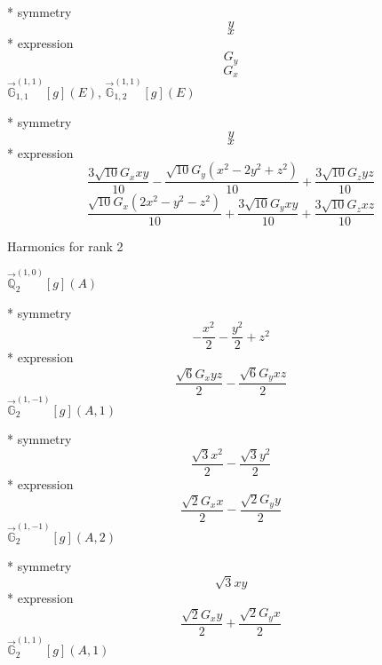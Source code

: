 \documentclass[fleqn,8pt]{jsarticle}
\begin{document}
\noindent\quad ** symmetry
\begin{dmath*}
y
\end{dmath*}
\begin{dmath*}
x
\end{dmath*}
\noindent\quad ** expression
\begin{dmath*}
G_{y}
\end{dmath*}
\begin{dmath*}
G_{x}
\end{dmath*}
\noindent\quad $\vec{\mathbb{G}}_{1,1}^{(1,1)}[g](E)$, $\vec{\mathbb{G}}_{1,2}^{(1,1)}[g](E)$

\noindent\quad ** symmetry
\begin{dmath*}
y
\end{dmath*}
\begin{dmath*}
x
\end{dmath*}
\noindent\quad ** expression
\begin{dmath*}
\frac{3 \sqrt{10} G_{x} x y}{10} - \frac{\sqrt{10} G_{y} \left(x^{2} - 2 y^{2} + z^{2}\right)}{10} + \frac{3 \sqrt{10} G_{z} y z}{10}
\end{dmath*}
\begin{dmath*}
\frac{\sqrt{10} G_{x} \left(2 x^{2} - y^{2} - z^{2}\right)}{10} + \frac{3 \sqrt{10} G_{y} x y}{10} + \frac{3 \sqrt{10} G_{z} x z}{10}
\end{dmath*}

\noindent * Harmonics for rank 2

\noindent\quad $\vec{\mathbb{Q}}_{2}^{(1,0)}[g](A)$

\noindent\quad ** symmetry
\begin{dmath*}
- \frac{x^{2}}{2} - \frac{y^{2}}{2} + z^{2}
\end{dmath*}
\noindent\quad ** expression
\begin{dmath*}
\frac{\sqrt{6} G_{x} y z}{2} - \frac{\sqrt{6} G_{y} x z}{2}
\end{dmath*}
\noindent\quad $\vec{\mathbb{G}}_{2}^{(1,-1)}[g](A,1)$

\noindent\quad ** symmetry
\begin{dmath*}
\frac{\sqrt{3} x^{2}}{2} - \frac{\sqrt{3} y^{2}}{2}
\end{dmath*}
\noindent\quad ** expression
\begin{dmath*}
\frac{\sqrt{2} G_{x} x}{2} - \frac{\sqrt{2} G_{y} y}{2}
\end{dmath*}
\noindent\quad $\vec{\mathbb{G}}_{2}^{(1,-1)}[g](A,2)$

\noindent\quad ** symmetry
\begin{dmath*}
\sqrt{3} x y
\end{dmath*}
\noindent\quad ** expression
\begin{dmath*}
\frac{\sqrt{2} G_{x} y}{2} + \frac{\sqrt{2} G_{y} x}{2}
\end{dmath*}
\noindent\quad $\vec{\mathbb{G}}_{2}^{(1,1)}[g](A,1)$
\end{document}

